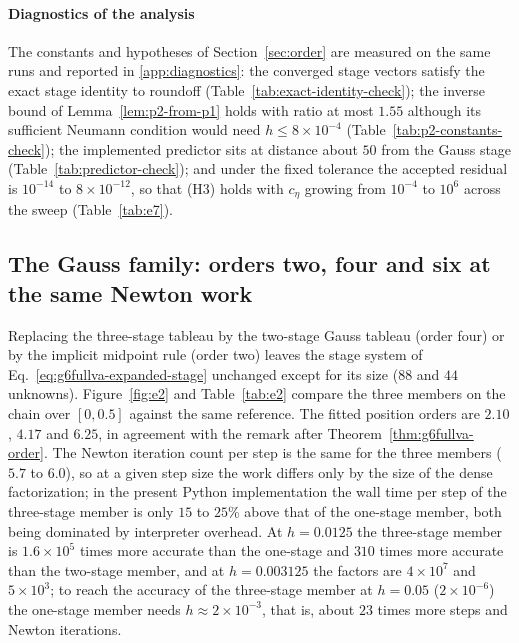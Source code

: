 \documentclass[preprint,12pt]{elsarticle}
\begin{document}
\paragraph{Diagnostics of the analysis}
The constants and hypotheses of Section~\ref{sec:order} are measured on the same runs and
reported in \ref{app:diagnostics}: the converged stage vectors satisfy the exact stage identity to
roundoff (Table~\ref{tab:exact-identity-check}); the inverse bound of Lemma~\ref{lem:p2-from-p1}
holds with ratio at most $1.55$ although its sufficient Neumann condition would need
$h\le8\times10^{-4}$ (Table~\ref{tab:p2-constants-check}); the implemented predictor sits at
distance about $50$ from the Gauss stage (Table~\ref{tab:predictor-check}); and under the fixed
tolerance the accepted residual is $10^{-14}$ to $8\times10^{-12}$, so that (H3) holds with
$c_\eta$ growing from $10^{-4}$ to $10^{6}$ across the sweep (Table~\ref{tab:e7}).

\subsection{The Gauss family: orders two, four and six at the same Newton work}
\label{sec:e2}

Replacing the three-stage tableau by the two-stage Gauss tableau (order four) or by the implicit
midpoint rule (order two) leaves the stage system of Eq.~\eqref{eq:g6fullva-expanded-stage}
unchanged except for its size ($88$ and $44$ unknowns). Figure~\ref{fig:e2} and
Table~\ref{tab:e2} compare the three members on the chain over $[0,0.5]$ against the same
reference. The fitted position orders are $2.10$, $4.17$ and $6.25$, in agreement with the remark
after Theorem~\ref{thm:g6fullva-order}. The Newton iteration count per step is the same for the
three members ($5.7$ to $6.0$), so at a given step size the work differs only by the size of the
dense factorization; in the present Python implementation the wall time per step of the three-stage member is only
$15$ to $25\%$ above that of the one-stage member, both being dominated by interpreter overhead. At $h=0.0125$ the three-stage
member is $1.6\times10^{5}$ times more accurate than the one-stage and $310$ times more accurate
than the two-stage member, and at $h=0.003125$ the factors are $4\times10^{7}$ and
$5\times10^{3}$; to reach the accuracy of the three-stage member at $h=0.05$ ($2\times10^{-6}$)
the one-stage member needs $h\approx2\times10^{-3}$, that is, about $23$ times more steps and
Newton iterations.
\end{document}
